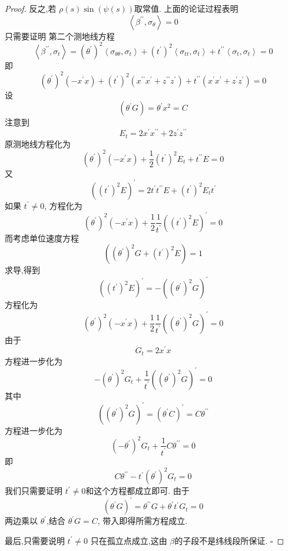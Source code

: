 \documentclass[../../main.tex]{subfiles}
\begin{document}
\begin{proof}
    反之,若 \(  \rho \left( s \right)\sin \left( \psi \left( s \right)  \right)    \)取常值. 上面的论证过程表明 \[
    \left<\beta ^{\prime \prime} , \sigma _{ \theta } \right>= 0
    \]只需要证明 第二个测地线方程\[
    \left<\beta ^{\prime \prime} , \sigma _{t} \right>= \left(  \theta ^{\prime}  \right)^{2}\left< \sigma _{ \theta  \theta }, \sigma _{t} \right>+ \left( t^{\prime}  \right)^{2}\left< \sigma _{tt}, \sigma _{t} \right>+ t^{\prime \prime} \left< \sigma _{t}, \sigma _{t} \right>= 0  
    \]即 \[
    \left(  \theta ^{\prime}  \right)^{2}\left( -x^{\prime} x \right)  + \left( t^{\prime}  \right)^{2}\left( x^{\prime \prime} x^{\prime} + z^{\prime \prime} z^{\prime}  \right)+ t^{\prime \prime} \left( x^{\prime} x^{\prime} + z^{\prime} z^{\prime}  \right)= 0   
    \]设 \[
    \left(  \theta ^{\prime} G \right)=  \theta ^{\prime} x^{2}= C 
    \] 注意到\[
    E_{t}= 2x^{\prime} x^{\prime \prime} + 2z^{\prime} z^{\prime \prime} 
    \]原测地线方程化为 \[
    \left(  \theta ^{\prime}  \right)^{2}\left( -x^{\prime} x\right)+\frac{1}{2} \left( t^{\prime}  \right)^{2}   E_{t}+ t^{\prime \prime} E= 0
    \] 又 \[
    \left(\left( t^{\prime}  \right)^{2}  E \right)^{\prime}= 2t^{\prime} t^{\prime \prime} E+ \left( t^{\prime}  \right)^{2}   E_{t}t^{\prime} 
    \]如果 \(  t^{\prime} \neq 0  \), 方程化为  \[
    \left(  \theta ^{\prime}  \right)^{2}\left( -x^{\prime} x \right)+ \frac{1}{2}\frac{1 }{t^{\prime}  } \left( \left( t^{\prime}  \right)^{2}E  \right)^{\prime} = 0   
    \]而考虑单位速度方程 \[
    \left( \left(  \theta ^{\prime}  \right)^{2}G+ \left( t^{\prime}  \right)^{2}E   \right)= 1 
    \]求导,得到 \[
    \left( \left( t^{\prime}  \right)^{2}E  \right)^{\prime} = -\left( \left(  \theta ^{\prime}  \right)^{2}G  \right)^{\prime}   
    \]方程化为 \[
   \left(  \theta ^{\prime}  \right)^{2}\left( -x^{\prime} x \right)+ \frac{1}{2}\frac{1 }{t^{\prime}  }  \left( \left(  \theta ^{\prime}  \right)^{2}G  \right)^{\prime} = 0   
    \]由于 \[
    G_{t}= 2x^{\prime} x
    \]方程进一步化为 \[
   - \left(  \theta ^{\prime}  \right)^{2}G_{t} + \frac{1 }{t^{\prime}  }  \left( \left(  \theta ^{\prime}  \right)^{2}G  \right)^{\prime} = 0 
    \]其中 \[
    \left( \left(  \theta ^{\prime}  \right)^{2}G  \right)^{\prime} = \left(  \theta ^{\prime} C \right)^{\prime} = C \theta ^{\prime \prime}   
    \]方程进一步化为 \[
    \left( - \theta ^{\prime}  \right)^{2}G_{t}+\frac{1 }{t^{\prime}  }  C \theta ^{\prime \prime} = 0 
    \]即 \[
     C\theta ^{\prime \prime} - t^{\prime} \left(  \theta ^{\prime}  \right)^{2}G_{t}= 0 
    \]我们只需要证明 \(  t^{\prime} \neq 0  \)和这个方程都成立即可. 由于 \[
    \left(  \theta ^{\prime} G \right)^{\prime} =  \theta ^{\prime \prime}G+  \theta ^{\prime} t^{\prime} G_{t}= 0 
    \] 两边乘以 \(   \theta ^{\prime}   \),结合 \(   \theta ^{\prime} G= C  \),  带入即得所需方程成立.

    最后,只需要说明 \(  t^{\prime} \neq 0  \) 只在孤立点成立,这由 \(  \beta   \)的子段不是纬线段所保证.  
    \hfill $\square$
\end{proof}
\end{document}
